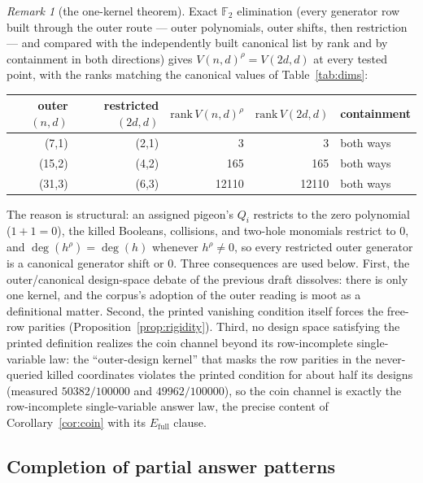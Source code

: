 \documentclass[11pt]{article}
\theoremstyle{definition}
\theoremstyle{remark}
\newtheorem{remark}[theorem]{Remark}
\newcommand{\F}{\mathbb{F}}
\begin{document}
\begin{remark}[the one-kernel theorem]\label{rem:onekernel}
Exact $\F_2$ elimination (every generator row built through the outer
route --- outer polynomials, outer shifts, then restriction --- and
compared with the independently built canonical list by rank and by
containment in both directions) gives $V(n,d)^{\rho}=V(2d,d)$ at every
tested point, with the ranks matching the canonical values of
Table~\ref{tab:dims}:
\begin{center}
\small
\begin{tabular}{rrrrl}
\hline
outer $(n,d)$ & restricted $(2d,d)$ & $\mathrm{rank}\,V(n,d)^{\rho}$ &
$\mathrm{rank}\,V(2d,d)$ & containment\\
\hline
(7,1)  & (2,1) & 3     & 3     & both ways\\
(15,2) & (4,2) & 165   & 165   & both ways\\
(31,3) & (6,3) & 12110 & 12110 & both ways\\
\hline
\end{tabular}
\end{center}
The reason is structural: an assigned pigeon's $Q_i$ restricts to the
zero polynomial ($1+1=0$), the killed Booleans, collisions, and
two-hole monomials restrict to $0$, and $\deg(h^{\rho})=\deg(h)$
whenever $h^{\rho}\neq0$, so every restricted outer generator is a
canonical generator shift or $0$.  Three consequences are used below.
First, the outer/canonical design-space debate of the previous draft
dissolves: there is only one kernel, and the corpus's adoption of the
outer reading is moot as a definitional matter.  Second, the printed
vanishing condition itself forces the free-row parities
(Proposition~\ref{prop:rigidity}).  Third, no design space satisfying
the printed definition realizes the coin channel beyond its
row-incomplete single-variable law: the ``outer-design kernel'' that
masks the row parities in the never-queried killed coordinates
violates the printed condition for about half its designs (measured
$50382/100000$ and $49962/100000$), so the coin channel is exactly the
row-incomplete single-variable answer law, the precise content of
Corollary~\ref{cor:coin} with its $E_{\mathrm{full}}$ clause.
\end{remark}

\subsection{Completion of partial answer patterns}
\end{document}

